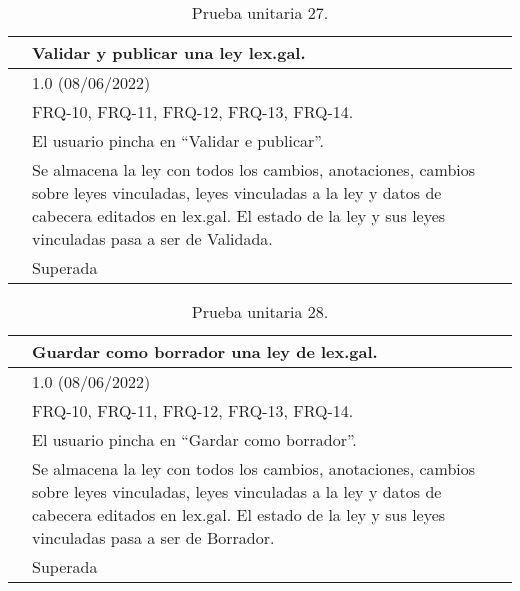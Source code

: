 \begin{table}[H]
\begin{center}
\begin{tabular}{|p{3cm}|p{10cm}|} \hline
\centering {\bf PU-27} & Validar y publicar una ley lex.gal.  \\ \hline\hline
\centering {\bf Versión} & 1.0 (08/06/2022) \\ \hline
\centering {\bf Dependencias} & FRQ-10, FRQ-11, FRQ-12, FRQ-13, FRQ-14. \\ \hline
\centering {\bf Descripción} &  El usuario pincha en ``Validar e publicar''. \\ \hline
\centering {\bf Criterio de aceptación} & Se almacena la ley con todos los cambios, anotaciones, cambios sobre leyes vinculadas, leyes vinculadas a la ley y datos de cabecera editados en lex.gal. El estado de la ley y sus leyes vinculadas pasa a ser de Validada. \\ \hline
\centering {\bf Estado} & Superada \\ \hline
\end{tabular}
\caption{Prueba unitaria 27.}
\label{enlacePU27}
\end{center}
\end{table}

\begin{table}[H]
\begin{center}
\begin{tabular}{|p{3cm}|p{10cm}|} \hline
\centering {\bf PU-28} & Guardar como borrador una ley de lex.gal.  \\ \hline\hline
\centering {\bf Versión} & 1.0 (08/06/2022) \\ \hline
\centering {\bf Dependencias} & FRQ-10, FRQ-11, FRQ-12, FRQ-13, FRQ-14. \\ \hline
\centering {\bf Descripción} &  El usuario pincha en ``Gardar como borrador''. \\ \hline
\centering {\bf Criterio de aceptación} & Se almacena la ley con todos los cambios, anotaciones, cambios sobre leyes vinculadas, leyes vinculadas a la ley y datos de cabecera editados en lex.gal. El estado de la ley y sus leyes vinculadas pasa a ser de Borrador. \\ \hline
\centering {\bf Estado} & Superada \\ \hline
\end{tabular}
\caption{Prueba unitaria 28.}
\label{enlacePU28}
\end{center}
\end{table}